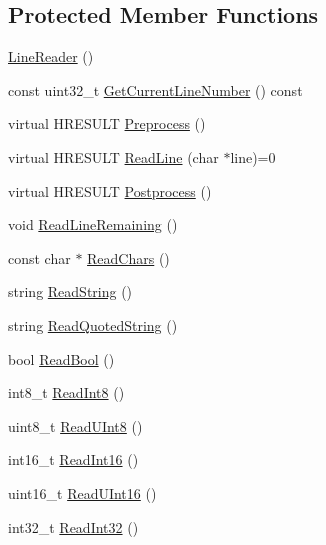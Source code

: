 \subsection*{Protected Member Functions}
\begin{DoxyCompactItemize}
\item 
\hyperlink{classmage_1_1_line_reader_ab4a46321d7ea3ecda2d6390c78a7285b}{Line\+Reader} ()
\item 
const uint32\+\_\+t \hyperlink{classmage_1_1_line_reader_ae7115d55bbb8a6e9b0764831624df33b}{Get\+Current\+Line\+Number} () const
\item 
virtual H\+R\+E\+S\+U\+LT \hyperlink{classmage_1_1_line_reader_a9a67c9527f499f19489f0680caa66ac9}{Preprocess} ()
\item 
virtual H\+R\+E\+S\+U\+LT \hyperlink{classmage_1_1_line_reader_a193ad5c9084eb87e8a98a3c1782d93ff}{Read\+Line} (char $\ast$line)=0
\item 
virtual H\+R\+E\+S\+U\+LT \hyperlink{classmage_1_1_line_reader_a4c8f2e1a60c6f3c98b4b47f3019c24f3}{Postprocess} ()
\item 
void \hyperlink{classmage_1_1_line_reader_a3a4b99bfef1e8a826d74a01bcc663fcb}{Read\+Line\+Remaining} ()
\item 
const char $\ast$ \hyperlink{classmage_1_1_line_reader_ad915c1a17549c7758c10f0b6db7e5611}{Read\+Chars} ()
\item 
string \hyperlink{classmage_1_1_line_reader_a51050682b0c06a36b0075beba0274b89}{Read\+String} ()
\item 
string \hyperlink{classmage_1_1_line_reader_ae5495a5fd889d91badab15f10186e370}{Read\+Quoted\+String} ()
\item 
bool \hyperlink{classmage_1_1_line_reader_a86289c358afe9b3bc5c7789bb8a6af95}{Read\+Bool} ()
\item 
int8\+\_\+t \hyperlink{classmage_1_1_line_reader_a3b88ec3a8555d79b25c2a8818a26f124}{Read\+Int8} ()
\item 
uint8\+\_\+t \hyperlink{classmage_1_1_line_reader_a943ce0074c0861109f8b4ee10df8a221}{Read\+U\+Int8} ()
\item 
int16\+\_\+t \hyperlink{classmage_1_1_line_reader_a5ec3ccfcd1044f6be73c51082d2b57e3}{Read\+Int16} ()
\item 
uint16\+\_\+t \hyperlink{classmage_1_1_line_reader_a89f8d84257eae17db8c1e67d17f839f9}{Read\+U\+Int16} ()
\item 
int32\+\_\+t \hyperlink{classmage_1_1_line_reader_a45c66ad0b4676ef3fb2b5b08f04b509d}{Read\+Int32} ()
\item 

\end{DoxyCompactItemize}

